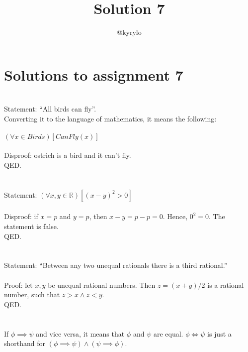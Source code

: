 \documentclass{article}
\title{Solution 7}
\author{@kyrylo}
\begin{document}
\section*{Solutions to assignment 7}

\section{}

Statement: ``All birds can fly''.
\\
Converting it to the language of mathematics, it means the following:
\\\\
$(\forall x \in Birds)[CanFly(x)]$
\\\\
Disproof: ostrich is a bird and it can't fly.
\\
QED.

\section{}

Statement: $(\forall x,y \in \mathbb{R})[(x - y)^2 > 0]$
\\\\
Disproof: if $x = p$ and $y = p$, then $x - y = p - p = 0$. Hence, $0^2 = 0$.
The statement is false.
\\
QED.

\section{}

Statement: ``Between any two unequal rationals there is a third rational.''
\\\\
Proof: let $x, y$ be unequal rational numbers. Then $z = (x + y) / 2$ is a
rational number, such that $z > x \wedge z < y$.
\\
QED.

\section{}

If $\phi \implies \psi$ and vice versa, it means that $\phi$ and $\psi$ are
equal. $\phi \Leftrightarrow \psi$ is just a shorthand for $(\phi \implies \psi) \wedge
(\psi \implies \phi)$.

\section{}
\end{document}
